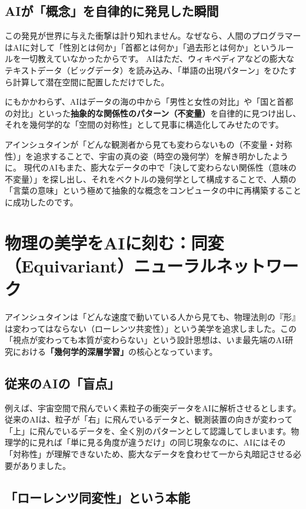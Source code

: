 \subsection{AIが「概念」を自律的に発見した瞬間}

この発見が世界に与えた衝撃は計り知れません。なぜなら、人間のプログラマーはAIに対して「性別とは何か」「首都とは何か」「過去形とは何か」というルールを一切教えていなかったからです。 AIはただ、ウィキペディアなどの膨大なテキストデータ（ビッグデータ）を読み込み、「単語の出現パターン」をひたすら計算して潜在空間に配置しただけでした。

にもかかわらず、AIはデータの海の中から「男性と女性の対比」や「国と首都の対比」といった\textbf{抽象的な関係性のパターン（不変量）}を自律的に見つけ出し、それを幾何学的な「空間の対称性」として見事に構造化してみせたのです。

アインシュタインが「どんな観測者から見ても変わらないもの（不変量・対称性）」を追求することで、宇宙の真の姿（時空の幾何学）を解き明かしたように。 現代のAIもまた、膨大なデータの中で「決して変わらない関係性（意味の不変量）」を探し出し、それをベクトルの幾何学として構成することで、人類の「言葉の意味」という極めて抽象的な概念をコンピュータの中に再構築することに成功したのです。

\section{物理の美学をAIに刻む：同変（Equivariant）ニューラルネットワーク}

アインシュタインは「どんな速度で動いている人から見ても、物理法則の『形』は変わってはならない（ローレンツ共変性）」という美学を追求しました。この「視点が変わっても本質が変わらない」という設計思想は、いま最先端のAI研究における\textbf{「幾何学的深層学習」}の核心となっています。

\subsection{従来のAIの「盲点」}

例えば、宇宙空間で飛んでいく素粒子の衝突データをAIに解析させるとします。 従来のAIは、粒子が「右」に飛んでいるデータと、観測装置の向きが変わって「上」に飛んでいるデータを、全く別のパターンとして認識してしまいます。物理学的に見れば「単に見る角度が違うだけ」の同じ現象なのに、AIにはその「対称性」が理解できないため、膨大なデータを食わせて一から丸暗記させる必要がありました。

\subsection{「ローレンツ同変性」という本能}

